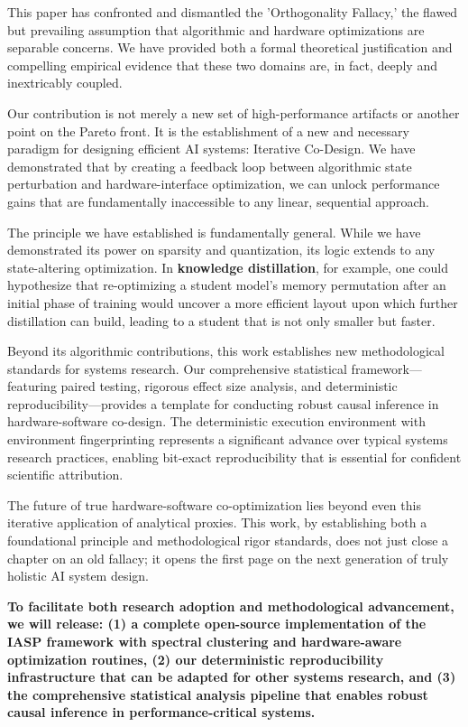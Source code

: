 \documentclass{article}
\begin{document}
This paper has confronted and dismantled the 'Orthogonality Fallacy,' the flawed but prevailing assumption that algorithmic and hardware optimizations are separable concerns. We have provided both a formal theoretical justification and compelling empirical evidence that these two domains are, in fact, deeply and inextricably coupled.

Our contribution is not merely a new set of high-performance artifacts or another point on the Pareto front. It is the establishment of a new and necessary paradigm for designing efficient AI systems: {Iterative Co-Design}. We have demonstrated that by creating a feedback loop between algorithmic state perturbation and hardware-interface optimization, we can unlock performance gains that are fundamentally inaccessible to any linear, sequential approach.

The principle we have established is fundamentally general. While we have demonstrated its power on sparsity and quantization, its logic extends to any state-altering optimization. In \textbf{knowledge distillation}, for example, one could hypothesize that re-optimizing a student model's memory permutation after an initial phase of training would uncover a more efficient layout upon which further distillation can build, leading to a student that is not only smaller but faster.

Beyond its algorithmic contributions, this work establishes new methodological standards for systems research. Our comprehensive statistical framework—featuring paired testing, rigorous effect size analysis, and deterministic reproducibility—provides a template for conducting robust causal inference in hardware-software co-design. The deterministic execution environment with environment fingerprinting represents a significant advance over typical systems research practices, enabling bit-exact reproducibility that is essential for confident scientific attribution.

The future of true hardware-software co-optimization lies beyond even this iterative application of analytical proxies. This work, by establishing both a foundational principle and methodological rigor standards, does not just close a chapter on an old fallacy; it opens the first page on the next generation of truly holistic AI system design.

\textbf{To facilitate both research adoption and methodological advancement, we will release: (1) a complete open-source implementation of the IASP framework with spectral clustering and hardware-aware optimization routines, (2) our deterministic reproducibility infrastructure that can be adapted for other systems research, and (3) the comprehensive statistical analysis pipeline that enables robust causal inference in performance-critical systems.}
\end{document}
